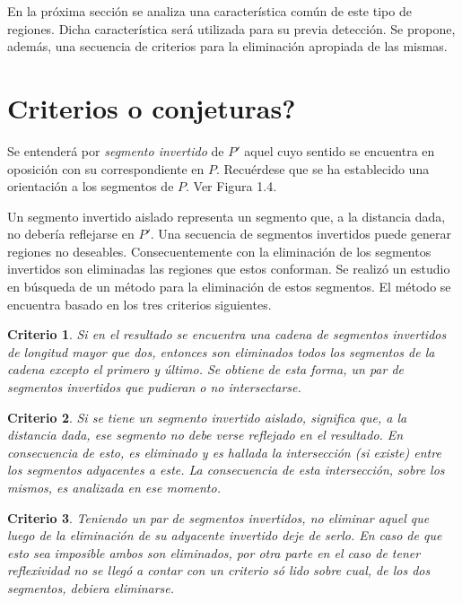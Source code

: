 \documentclass[12pt,english]{report}
\newtheorem{claim}{Criterio}[section]
\begin{document}
En la pr\'oxima secci\'on se analiza una caracter\'istica com\'un de este tipo de regiones. Dicha caracter\'istica ser\'a utilizada para su previa detecci\'on. Se propone, adem\'as, una secuencia de criterios para la eliminaci\'on apropiada de las mismas.

\section{\textquestiondown Criterios o conjeturas?}

Se entender\'a por \emph{segmento invertido} de $P'$ aquel cuyo sentido se encuentra en oposici\'on con su correspondiente en $P$. Recu\'erdese que se ha establecido una orientaci\'on a los segmentos de $P$. Ver Figura 1.4.\bigskip

Un segmento invertido aislado representa un segmento que, a la distancia dada, no deber\'ia reflejarse en $P'$. Una secuencia de segmentos invertidos puede generar regiones no deseables. Consecuentemente con la eliminaci\'on de los segmentos invertidos son eliminadas las regiones que estos conforman. Se realiz\'o un estudio en b\'usqueda de un m\'etodo para la eliminaci\'on de estos segmentos. El m\'etodo se encuentra basado en los tres criterios siguientes.

\begin{claim}
Si en el resultado se encuentra una cadena de segmentos invertidos de
longitud mayor que dos, entonces son eliminados todos los segmentos de la cadena
excepto el primero y \'{u}ltimo. Se obtiene de esta forma, un par de segmentos
invertidos que pudieran o no intersectarse.
\end{claim}

\begin{claim}
Si se tiene un segmento invertido aislado, significa que, a la distancia dada, ese
segmento no debe verse reflejado en el resultado. En consecuencia de esto, es
eliminado y es hallada la intersecci\'{o}n (si existe) entre los segmentos
adyacentes a este. La consecuencia de esta intersecci\'on, sobre los mismos, es analizada en ese momento.
\end{claim}

\begin{claim}
Teniendo un par de segmentos invertidos, no eliminar aquel que luego de la
eliminaci\'{o}n de su adyacente invertido deje de serlo. En caso de que esto
sea imposible ambos son eliminados, por otra parte en el caso de tener
reflexividad no se lleg\'o a contar con un criterio s\'{o}%
lido sobre cual, de los dos segmentos, debiera eliminarse.
\end{claim}        
\end{document}
